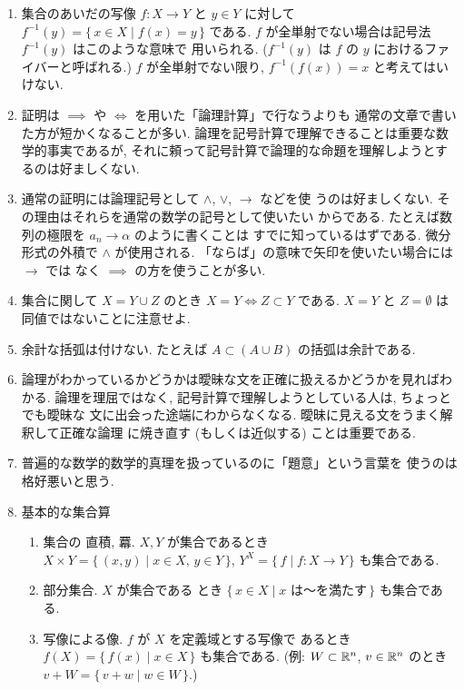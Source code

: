 \documentclass[12pt,twoside]{jarticle}
\begin{document}
\begin{enumerate}
\item 集合のあいだの写像 $f:X\to Y$ と $y\in Y$ に対して %
  $f^{-1}(y)=\{\,x\in X\mid f(x)=y\,\}$ である. 
  $f$ が全単射でない場合は記号法 $f^{-1}(y)$ はこのような意味で
  用いられる. ($f^{-1}(y)$ は $f$ の $y$ におけるファイバーと呼ばれる.)
  $f$ が全単射でない限り, $f^{-1}(f(x))=x$ と考えてはいけない.

\item 証明は $\implies$ や $\iff$ を用いた「論理計算」で行なうよりも
  通常の文章で書いた方が短かくなることが多い.
  論理を記号計算で理解できることは重要な数学的事実であるが,
  それに頼って記号計算で論理的な命題を理解しようとするのは好ましくない.
  
\item 通常の証明には論理記号として $\wedge$, $\vee$, $\rightarrow$ などを使
  うのは好ましくない. その理由はそれらを通常の数学の記号として使いたい
  からである. たとえば数列の極限を $a_n\rightarrow\alpha$ のように書くことは
  すでに知っているはずである. 微分形式の外積で $\wedge$ が使用される.
  「ならば」の意味で矢印を使いたい場合には $\rightarrow$ では
  なく $\implies$ の方を使うことが多い.

\item 集合に関して $X=Y\cup Z$ のとき $X=Y \iff Z\subset Y$ である.
  $X=Y$ と $Z=\emptyset$ は同値ではないことに注意せよ.

\item 余計な括弧は付けない. たとえば $A\subset(A\cup B)$ の括弧は余計である.

\item 論理がわかっているかどうかは曖昧な文を正確に扱えるかどうかを見ればわかる.
  論理を理屈ではなく, 記号計算で理解しようとしている人は, ちょっとでも曖昧な
  文に出会った途端にわからなくなる. 曖昧に見える文をうまく解釈して正確な論理
  に焼き直す (もしくは近似する) ことは重要である.
  
\item 普遍的な数学的数学的真理を扱っているのに「題意」という言葉を
  使うのは格好悪いと思う.

\item 基本的な集合算
  \begin{enumerate}
  \item 集合の
    直積, 羃. 
    $X,Y$ が集合であるとき \\%
    $X\times Y=\{\,(x,y)\mid x\in X,\, y\in Y\,\}$, %
    $Y^X=\{\, f \mid f:X\to Y \,\}$ も集合である. 
  \item 部分集合. $X$ が集合である
    とき $\{\,x\in X\mid \text{$x$ は〜を満たす}\,\}$ も集合である.
  \item 写像による像. $f$ が $X$ を定義域とする写像で
    あるとき $f(X)=\{\, f(x)\mid x\in X\,\}$ も集合である.
    (例: $W\subset{\mathbb R}^n$, $v\in{\mathbb R}^n$ のとき $v+W=\{\,v+w\mid w\in W\,\}$.)
  \end{enumerate}
\end{enumerate}
\end{document}

